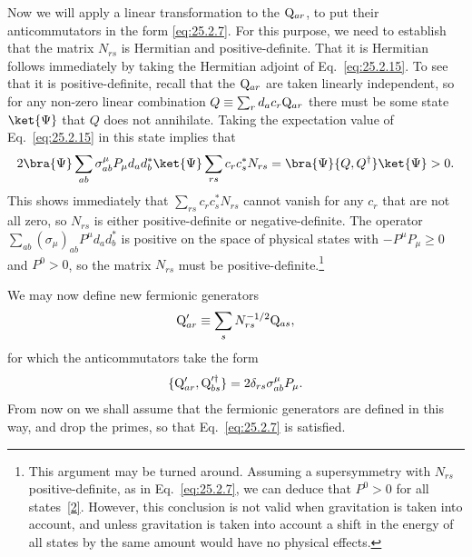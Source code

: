 Now we will apply a linear transformation to the \(\mathrm{Q}_{ar}\), to put
their anticommutators in the form \eqref{eq:25.2.7}. For this purpose, we
need to establish that the matrix \(N_{rs}\) is Hermitian and
positive-definite. That it is Hermitian follows immediately by taking the
Hermitian adjoint of Eq.~\eqref{eq:25.2.15}. To see that it is
positive-definite, recall that the \(\mathrm{Q}_{ar}\) are taken linearly
independent, so for any non-zero linear combination
\(Q\equiv\sum_r d_a c_r\mathrm{Q}_{ar}\) there must be some state
\(\ket{\Psi}\) that \(Q\) does not annihilate. Taking the expectation
value of Eq.~\eqref{eq:25.2.15} in this state implies that
\[
2\bra{\Psi}
\sum_{ab}\sigma^\mu_{ab}P_\mu d_a d_b^*
\ket{\Psi}
\sum_{rs}c_rc_s^*N_{rs}
=\bra{\Psi}\{Q,Q^\dagger\}\ket{\Psi}>0.
\]
This shows immediately that \(\sum_{rs}c_rc_s^*N_{rs}\) cannot vanish for
any \(c_r\) that are not all zero, so \(N_{rs}\) is either
positive-definite or negative-definite. The operator
\(\sum_{ab}(\sigma_\mu)_{ab}P^\mu d_ad_b^*\) is positive on the space of
physical states with \(-P^\mu P_\mu\geq0\) and \(P^0>0\), so the matrix
\(N_{rs}\) must be positive-definite.\footnote{This argument may be turned
around. Assuming a supersymmetry with \(N_{rs}\) positive-definite, as in
Eq.~\eqref{eq:25.2.7}, we can deduce that \(P^0>0\) for all
states~\hyperref[ch25-ref-2]{[2]}. However, this conclusion is not valid
when gravitation is taken into account, and unless gravitation is taken
into account a shift in the energy of all states by the same amount would
have no physical effects.}

We may now define new fermionic generators
\[
\mathrm{Q}'_{ar}\equiv\sum_sN^{-1/2}_{rs}\mathrm{Q}_{as},
\]
for which the anticommutators take the form
\[
\{\mathrm{Q}'_{ar},\mathrm{Q}_{bs}^{\prime\dagger}\}
=2\delta_{rs}\sigma^\mu_{ab}P_\mu.
\]
From now on we shall assume that the fermionic generators are defined in
this way, and drop the primes, so that Eq.~\eqref{eq:25.2.7} is satisfied.

